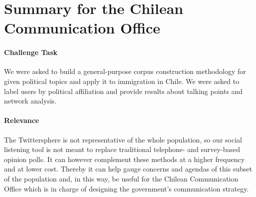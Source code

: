 \newpage
\clearpage 
{} %

\section*{Summary for the Chilean Communication Office}\label{sec_summ}



    
    
    
    \paragraph{Challenge Task}
        We were asked to build a general-purpose corpus construction methodology for given political topics and apply it to immigration in Chile. We were asked to label users by political affiliation and provide results about talking points and network analysis.
        
    
    \paragraph{Relevance}
        The Twittersphere is not representative of the whole population, so our social listening tool is not meant to replace traditional telephone- and survey-based opinion polls. It can however complement these methods at a higher frequency and at lower cost.
        Thereby it can help gauge concerns and agendas of this subset of the population and, in this way, be useful for the Chilean Communication Office which is in charge of designing the government's communication strategy. 
        
